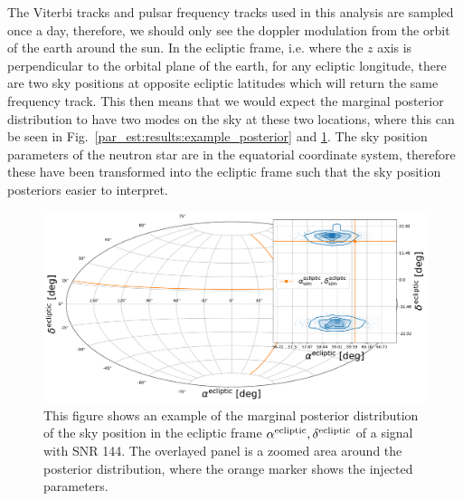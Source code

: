 The Viterbi tracks and pulsar frequency tracks used in this analysis are sampled once a day, therefore, we should only see the doppler modulation from the orbit of the earth around the sun.
In the ecliptic frame, i.e. where the $z$ axis is perpendicular to the orbital plane of the earth, for any ecliptic longitude, there are two sky positions at opposite ecliptic latitudes which will return the same frequency track. 
This then means that we would expect the marginal posterior distribution to have two modes on the sky at these two locations, where this can be seen in Fig.~\ref{par_est:results:example_posterior} and \ref{par_est:results:example_skypos}.
The sky position parameters of the neutron star are in the equatorial coordinate system, therefore these have been transformed into the ecliptic frame such that the sky position posteriors easier to interpret.
%
\begin{figure}[ht]
    \centering
    \includegraphics[width=\linewidth]{C5_parameter/skypos_ecliptic.pdf}
    \caption[Example of posterior of sky position in ecliptic frame]{This figure shows an example of the marginal posterior distribution of the sky position in the ecliptic frame $\alpha^{\rm{ecliptic}},\delta^{\rm{ecliptic}}$ of a signal with \gls{SNR} 144. The overlayed panel is a zoomed area around the posterior distribution, where the orange marker shows the injected parameters.}
    \label{par_est:results:example_skypos}
    
\end{figure}
%

%
%
